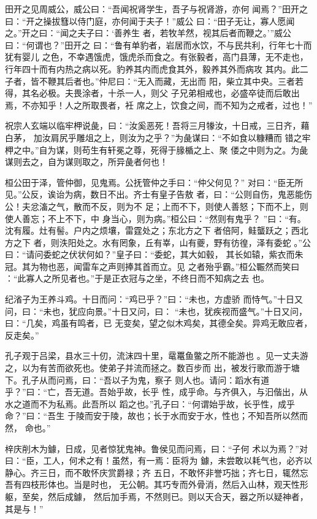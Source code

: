 \documentclass[a4paper,12pt,UTF8,twoside]{ctexbook}
\begin{document}
田开之见周威公，威公曰：“吾闻祝肾学生，吾子与祝肾游，亦何 闻焉？”田开之曰：“开之操拔篲以侍门庭，亦何闻于夫子！”威公 曰：“田子无让，寡人愿闻之。”开之曰：“闻之夫子曰：‘善养生 者，若牧羊然，视其后者而鞭之。’”威公曰：“何谓也？”田开之 曰：“鲁有单豹者，岩居而水饮，不与民共利，行年七十而犹有婴儿 之色，不幸遇饿虎，饿虎杀而食之。有张毅者，高门县薄，无不走也， 行年四十而有内热之病以死。豹养其内而虎食其外，毅养其外而病攻 其内。此二子者，皆不鞭其后者也。”仲尼曰：“无入而藏，无出而 阳，柴立其中央。三者若得，其名必极。夫畏涂者，十杀一人，则父 子兄弟相戒也，必盛卒徒而后敢出焉，不亦知乎！人之所取畏者，衽 席之上，饮食之间，而不知为之戒者，过也！”

祝宗人玄端以临牢柙说彘，曰：“汝奚恶死！吾将三月㹖汝，十日戒，三日齐，藉白茅， 加汝肩尻乎雕俎之上，则汝为之乎？”为彘谋曰：“不如食以糠糟而 错之牢柙之中。”自为谋，则苟生有轩冕之尊，死得于腞楯之上、聚 偻之中则为之。为彘谋则去之，自为谋则取之，所异彘者何也！

桓公田于泽，管仲御，见鬼焉。公抚管仲之手曰：“仲父何见？” 对曰：“臣无所见。”公反，诶诒为病，数日不出。齐士有皇子告敖 者，曰：“公则自伤，鬼恶能伤公！夫忿滀之气，散而不反，则为不 足；上而不下，则使人善怒；下而不上，则使人善忘；不上不下，中 身当心，则为病。”桓公曰：“然则有鬼乎？ ”曰：“有。沈有履。灶有髻。户内之烦壤，雷霆处之；东北方之下 者倍阿，鲑蠪跃之；西北方之下 者，则泆阳处之。水有罔象，丘有峷，山有夔，野有彷徨，泽有委蛇 。”公曰：“请问委蛇之伏状何如？”皇子曰：“委蛇，其大如毂， 其长如辕，紫衣而朱冠。其为物也恶，闻雷车之声则捧其首而立。见 之者殆乎霸。”桓公辴然而笑曰 ：“此寡人之所见者也。”于是正衣冠与之坐，不终日而不知病之去 也。

纪渻子为王养斗鸡。十日而问：“鸡已乎？”曰：“未也，方虚骄 而恃气。”十日又问，曰：“未也，犹应向景。”十日又问，曰： “未也，犹疾视而盛气。”十日又问，曰：“几矣，鸡虽有鸣者，已 无变矣，望之似木鸡矣，其德全矣。异鸡无敢应者，反走矣。”

孔子观于吕梁，县水三十仞，流沫四十里，鼋鼍鱼鳖之所不能游也 。见一丈夫游之，以为有苦而欲死也。使弟子并流而拯之。数百步而 出，被发行歌而游于塘下。孔子从而问焉，曰：“吾以子为鬼，察子 则人也。请问：蹈水有道乎？”曰：“亡，吾无道。吾始乎故，长乎 性，成乎命。与齐俱入，与汩偕出，从水之道而不为私焉。此吾所以 蹈之也。”孔子曰：“何谓始乎故，长乎性，成乎命？”曰：“吾生 于陵而安于陵，故也；长于水而安于水，性也；不知吾所以然而然， 命也。”

梓庆削木为鐻，日成，见者惊犹鬼神。鲁侯见而问焉，曰：“子何 术以为焉？”对曰：“臣，工人，何术之有！虽然，有一焉：臣将为 鐻，未尝敢以耗气也，必齐以静心。齐三日，而不敢怀庆赏爵禄；齐 五日，不敢怀非誉巧拙；齐七日，辄然忘吾有四枝形体也。当是时也， 无公朝。其巧专而外骨消，然后入山林，观天性形躯，至矣，然后成鐻， 然后加手焉，不然则已。则以天合天，器之所以疑神者，其是与！”
\end{document}
